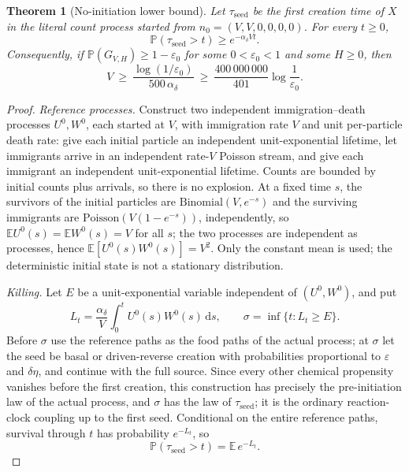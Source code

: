 \documentclass[11pt,a4paper]{article}
\theoremstyle{plain}
\newtheorem{theorem}{Theorem}[section]
\theoremstyle{definition}
\theoremstyle{remark}
\newcommand{\E}{\mathbb E}
\newcommand{\Prob}{\mathbb P}
\newcommand{\eps}{\varepsilon}
\newcommand{\dd}{\,\mathrm d}
\newcommand{\Good}{G_{V,H}}
\newcommand{\tseed}{\tau_{\mathrm{seed}}}
\begin{document}
\begin{theorem}[No-initiation lower bound]\label{thm:init}
Let $\tseed$ be the first creation time of $X$ in the literal count process started from $n_0=(V,V,0,0,0,0)$. For every $t\ge0$,
\begin{equation}\label{eq:noinit}
 \Prob(\tseed>t)\ge e^{-\alpha_\delta Vt}.
\end{equation}
Consequently, if $\Prob(\Good)\ge1-\eps_0$ for some $0<\eps_0<1$ and some $H\ge0$, then
\begin{equation}\label{eq:necessary}
 V\ \ge\ \frac{\log(1/\eps_0)}{500\,\alpha_\delta}\ \ge\ \frac{400\,000\,000}{401}\log\frac1{\eps_0}.
\end{equation}
\end{theorem}
\begin{proof}
\emph{Reference processes.} Construct two independent immigration--death processes $U^0,W^0$, each started at $V$, with immigration rate $V$ and unit per-particle death rate: give each initial particle an independent unit-exponential lifetime, let immigrants arrive in an independent rate-$V$ Poisson stream, and give each immigrant an independent unit-exponential lifetime. Counts are bounded by initial counts plus arrivals, so there is no explosion. At a fixed time $s$, the survivors of the initial particles are $\mathrm{Binomial}(V,e^{-s})$ and the surviving immigrants are $\mathrm{Poisson}(V(1-e^{-s}))$, independently, so $\E U^0(s)=\E W^0(s)=V$ for all $s$; the two processes are independent as processes, hence $\E[U^0(s)W^0(s)]=V^2$. Only the constant mean is used; the deterministic initial state is not a stationary distribution.

\emph{Killing.} Let $E$ be a unit-exponential variable independent of $(U^0,W^0)$, and put
\[
 L_t=\frac{\alpha_\delta}V\int_0^tU^0(s)W^0(s)\dd s,\qquad \sigma=\inf\{t:L_t\ge E\}.
\]
Before $\sigma$ use the reference paths as the food paths of the actual process; at $\sigma$ let the seed be basal or driven-reverse creation with probabilities proportional to $\eps$ and $\delta\eta$, and continue with the full source. Since every other chemical propensity vanishes before the first creation, this construction has precisely the pre-initiation law of the actual process, and $\sigma$ has the law of $\tseed$; it is the ordinary reaction-clock coupling up to the first seed. Conditional on the entire reference paths, survival through $t$ has probability $e^{-L_t}$, so
\begin{equation}\label{eq:identity}
 \Prob(\tseed>t)=\E\,e^{-L_t}.
\end{equation}


\end{proof}
\end{document}
